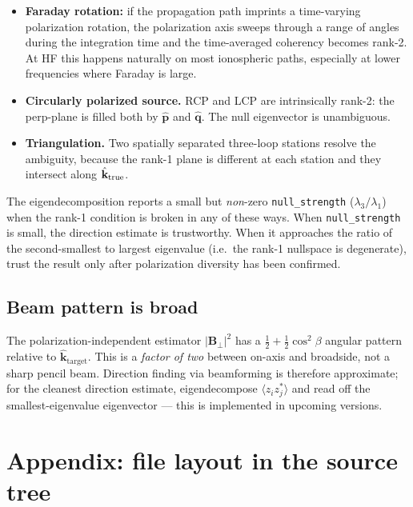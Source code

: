 \documentclass[11pt]{article}
\begin{document}
\begin{itemize}\itemsep=2pt
\item \textbf{Faraday rotation:} if the propagation path imprints a
      time-varying polarization rotation, the polarization axis
      sweeps through a range of angles during the integration time
      and the time-averaged coherency becomes rank-2.  At HF this
      happens naturally on most ionospheric paths, especially at
      lower frequencies where Faraday is large.
\item \textbf{Circularly polarized source.}  RCP and LCP are
      intrinsically rank-2: the perp-plane is filled both by
      $\hat{\mathbf p}$ and $\hat{\mathbf q}$.  The null eigenvector
      is unambiguous.
\item \textbf{Triangulation.}  Two spatially separated three-loop
      stations resolve the ambiguity, because the rank-1 plane is
      different at each station and they intersect along
      $\hat{\mathbf k}_{\rm true}$.
\end{itemize}

The eigendecomposition reports a small but \emph{non}-zero
\texttt{null\_strength} ($\lambda_3/\lambda_1$) when the rank-1
condition is broken in any of these ways.  When
\texttt{null\_strength} is small, the direction estimate is
trustworthy.  When it approaches the ratio of the second-smallest to
largest eigenvalue (i.e.\ the rank-1 nullspace is degenerate), trust
the result only after polarization diversity has been confirmed.

\subsection{Beam pattern is broad}

The polarization-independent estimator $|\mathbf B_\perp|^2$ has a
$\frac{1}{2}+\frac{1}{2}\cos^2\!\beta$ angular pattern relative to
$\hat{\mathbf k}_\mathrm{target}$.  This is a \emph{factor of two}
between on-axis and broadside, not a sharp pencil beam.  Direction
finding via beamforming is therefore approximate; for the cleanest
direction estimate, eigendecompose $\langle z_iz_j^*\rangle$ and read
off the smallest-eigenvalue eigenvector --- this is implemented in
upcoming versions.

\section{Appendix: file layout in the source tree}
\end{document}
